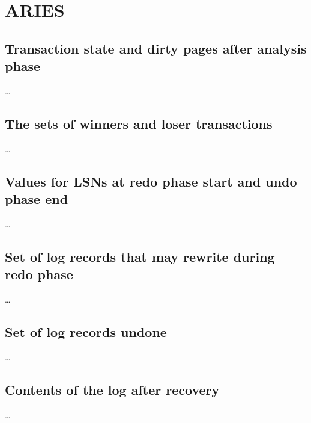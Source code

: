 
\section{ARIES}

\subsection{Transaction state and dirty pages after analysis phase}
\dots

\subsection{The sets of winners and loser transactions}
\dots

\subsection{Values for LSNs at redo phase start and undo phase end}
\dots

\subsection{Set of log records that may rewrite during redo phase}
\dots

\subsection{Set of log records undone}
\dots

\subsection{Contents of the log after recovery}
\dots

